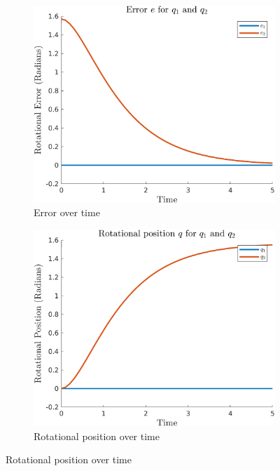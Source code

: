 \documentclass{article}
\begin{document}
\begin{figure}[H]
    \centering
    \begin{subfigure}{0.325\textwidth}
        \centering
        \includegraphics[width = \textwidth]{figures/error-c1.png}
        \caption{Error over time}
    \end{subfigure}
    \begin{subfigure}{0.325\textwidth}
        \centering
        \includegraphics[width = \textwidth]{figures/rotational-position-c1.png}
        \caption{Rotational position over time}
    \end{subfigure}

\end{figure}
\end{document}
